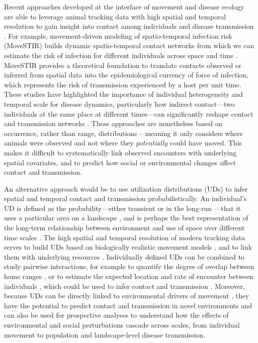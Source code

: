 \documentclass[letterpaper]{article}
\begin{document}
Recent approaches developed at the interface of movement and disease ecology are able to leverage animal tracking data with high spatial and temporal resolution to gain insight into contact among individuals and disease transmission \citep{Richardson2015,Wilber2022,Yang2023}. For example, movement-driven modeling of spatio-temporal infection risk (MoveSTIR) builds dynamic spatio-temporal contact networks from which we can estimate the risk of infection for different individuals across space and time \citep{Wilber2022}. MoveSTIR provides a theoretical foundation to translate contacts observed or inferred from spatial data into the epidemiological currency of force of infection, which represents the risk of transmission experienced by a host per unit time. These studies have highlighted the importance of individual heterogeneity and temporal scale for disease dynamics, particularly how indirect contact---two individuals at the same place at different times---can significantly reshape contact and transmission networks \citep{Richardson2015,Yang2023}. These approaches are nonetheless based on occurrence, rather than range, distributions \citep[in the terminology of ][]{Alston2022} -- meaning it only considers where animals were observed and not where they \emph{potentially} could have moved. This makes it difficult to systematically link observed encounters with underlying spatial covariates, and to predict how social or environmental changes affect contact and transmission. 

An alternative approach would be to use utilization distributions (UDs) to infer spatial and temporal contact and transmission probabilistically. An individual's UD is defined as the probability---either transient or in the long-run \citep{Tao2016}---that it uses a particular area on a landscape \citep{Worton1989}, and is perhaps the best representation of the long-term relationship between environment and use of space over different time scales \citet{Webber2023}. The high spatial and temporal resolution of modern tracking data serves to build UDs based on biologically realistic movement models \citep{Kranstauber2012,Fleming2014}, and to link them with underlying resources \citep{Potts2023}.
Individually defined UDs can be combined to study pairwise interactions, for example to quantify the degree of overlap between home ranges \citep{Winner2018}, or to estimate the expected location and rate of encounter between individuals  \citep{Noonan2021}, which could be used to infer contact and transmission \citep{Godfrey2010, Godfrey2013,Noonan2021}. 
Moreover, because UDs can be directly linked to environmental drivers of movement \citep{Signer2017}, they have the potential to predict contact and transmission in novel environments and can also be used for prospective analyses to understand how the effects of environmental and social perturbations cascade across scales, from individual movement to population and landscape-level disease transmission. 
\end{document}
